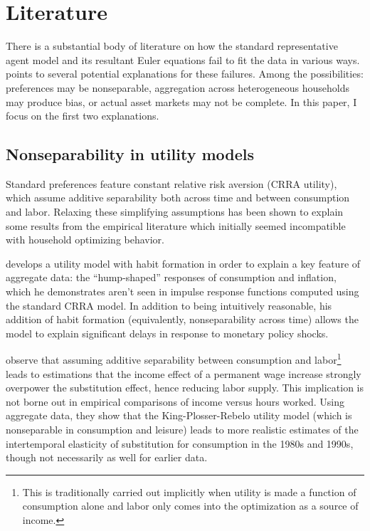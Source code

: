 \section{Literature}
There is a substantial body of literature on how the standard representative agent model and its resultant Euler equations fail to fit the data in various ways. \cite{parker99} points to several potential explanations for these failures. Among the possibilities: preferences may be nonseparable, aggregation across heterogeneous households may produce bias, or actual asset markets may not be complete. In this paper, I focus on the first two explanations.



\subsection{Nonseparability in utility models}
Standard preferences feature constant relative risk aversion (CRRA utility), which assume additive separability both across time and between consumption and labor. Relaxing these simplifying assumptions has been shown to explain some results from the empirical literature which initially seemed incompatible with household optimizing behavior.

\cite{fuhrer00} develops a utility model with habit formation in order to explain a key feature of aggregate data: the ``hump-shaped'' responses of consumption and inflation, which he demonstrates aren't seen in impulse response functions computed using the standard CRRA model. In addition to being intuitively reasonable, his addition of habit formation (equivalently, nonseparability across time) allows the model to explain significant delays in response to monetary policy shocks.

\cite{basu02} observe that assuming additive separability between consumption and labor\footnote{This is traditionally carried out implicitly when utility is made a function of consumption alone and labor only comes into the optimization as a source of income.} leads to estimations that the income effect of a permanent wage increase strongly overpower the substitution effect, hence reducing labor supply. This implication is not borne out in empirical comparisons of income versus hours worked. Using aggregate data, they show that the King-Plosser-Rebelo utility model (which is nonseparable in consumption and leisure) leads to more realistic estimates of the intertemporal elasticity of substitution for consumption in the 1980s and 1990s, though not necessarily as well for earlier data.



